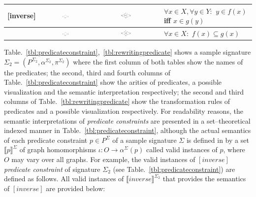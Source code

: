 \documentclass{eceasst}
\begin{document}
\begin{table}[h]
\begin{center}
\begin{tabular}{| l | c | c | p{6cm} | }
    [inverse] & \includegraphics[width=0.13\textwidth]{inv_1.pdf} & \includegraphics[width=0.16\textwidth]{inv_vis.pdf} & $\forall x \in X, \forall y \in Y :$  $y \in f(x)$ iff $x \in g(y) $  \\ \hline 
    [image-inclusion] & \includegraphics[width=0.13\textwidth]{img_1.pdf} & \includegraphics[width=0.16\textwidth]{img_vis.pdf} & $\forall x \in X :$  $f(x) \subseteq g(x) $  \\     
    \hline    
    \end{tabular}
    \end{center}
\end{table}







Table.~\ref{tbl:predicateconstraint},~\ref{tbl:rewritingpredicate} shows a sample signature $\Sigma_2 = (P^{\Sigma_2}, \alpha^{\Sigma_2}, \pi^{\Sigma_2})$ where the first column of 
both tables show the names of the predicates; the second, third and fourth columns of Table.~\ref{tbl:predicateconstraint} show the arities of predicates, a possible visualization 
and the semantic interpretation respectively; the second and third columns of Table.~\ref{tbl:rewritingpredicate} show the transformation rules of predicates and a possible visualization respectively.
For readability reasons, the semantic interpretations of \textit{predicate constraints} are presented in a set--theoretical indexed manner in Table.~\ref{tbl:predicateconstraint}, 
although the actual semantics of each predicate constraint $p \in P^{\Sigma}$ of a sample signature $\Sigma$ is defined in \cite{Rutle10} by a set $\llbracket p \rrbracket^{\Sigma}$ of 
graph homomorphisms $\iota : O \rightarrow \alpha^{\Sigma}(p)$ called valid instances of $p$, where $O$ may vary over all graphs. 
For example, the valid instances of $[inverse]$ \textit{predicate constraint} of signature $\Sigma_2$ (see Table.~\ref{tbl:predicateconstraint}) are defined as follows. 
All valid instances of $\llbracket inverse \rrbracket^{\Sigma_2}$ that provides the semantics of $[inverse]$ are provided below: 
\end{document}
